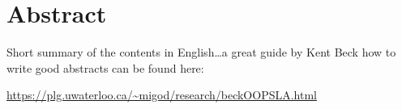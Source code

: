 \begingroup
\let\clearpage\relax
\let\cleardoublepage\relax
\let\cleardoublepage\relax

\chapter*{Abstract}
Short summary of the contents in English\dots a great guide by
Kent Beck how to write good abstracts can be found here:
\begin{center}
\url{https://plg.uwaterloo.ca/~migod/research/beckOOPSLA.html}
\end{center}

\vfill


\endgroup

\vfill

